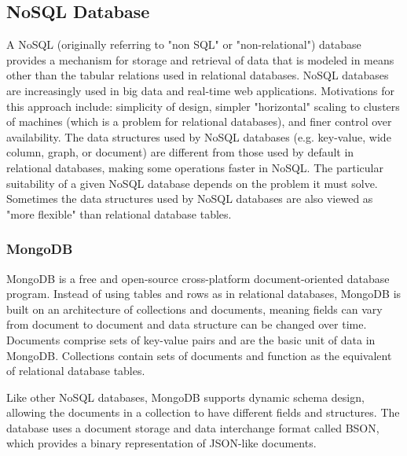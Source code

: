 \subsection{NoSQL Database}
A NoSQL (originally referring to "non SQL" or "non-relational") database provides a mechanism for storage and retrieval of data that is modeled in means other than the tabular relations used in relational databases. NoSQL databases are increasingly used in big data and real-time web applications. Motivations for this approach include: simplicity of design, simpler "horizontal" scaling to clusters of machines (which is a problem for relational databases), and finer control over availability. The data structures used by NoSQL databases (e.g. key-value, wide column, graph, or document) are different from those used by default in relational databases, making some operations faster in NoSQL. The particular suitability of a given NoSQL database depends on the problem it must solve. Sometimes the data structures used by NoSQL databases are also viewed as "more flexible" than relational database tables.

\subsubsection{MongoDB}
MongoDB is a free and open-source cross-platform document-oriented database program. Instead of using tables and rows as in relational databases, MongoDB is built on an architecture of collections and documents, meaning fields can vary from document to document and data structure can be changed over time. Documents comprise sets of key-value pairs and are the basic unit of data in MongoDB. Collections contain sets of documents and function as the equivalent of relational database tables. \par 
	Like other NoSQL databases, MongoDB supports dynamic schema design, allowing the documents in a collection to have different fields and structures. The database uses a document storage and data interchange format called BSON, which provides a binary representation of JSON-like documents.


